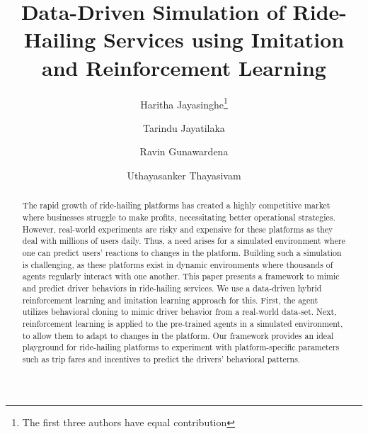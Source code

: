 \documentclass[runningheads]{llncs}
\begin{document}
%
\title{Data-Driven Simulation of Ride-Hailing Services using Imitation and Reinforcement Learning}
%
%
\newcommand*\samethanks[1][\value{footnote}]{\footnotemark[#1]}
\author{Haritha Jayasinghe\thanks{The first three authors have equal contribution} \and
Tarindu Jayatilaka\samethanks \and
Ravin Gunawardena\samethanks \and
Uthayasanker Thayasivam}
%
%
%
\maketitle              %

\begin{abstract}
The rapid growth of ride-hailing platforms has created a highly competitive market where businesses struggle to make profits, necessitating better operational strategies. However, real-world experiments are risky and expensive for these platforms as they deal with millions of users daily. Thus, a need arises for a simulated environment where one can predict users' reactions to changes in the platform. Building such a simulation is challenging, as these platforms exist in dynamic environments where thousands of agents regularly interact with one another. This paper presents a framework to mimic and predict driver behaviors in ride-hailing services. We use a data-driven hybrid reinforcement learning and imitation learning approach for this. First, the agent utilizes behavioral cloning to mimic driver behavior from a real-world data-set. Next, reinforcement learning is applied to the pre-trained agents in a simulated environment, to allow them to adapt to changes in the platform. Our framework provides an ideal playground for ride-hailing platforms to experiment with platform-specific parameters such as trip fares and incentives to predict the drivers’ behavioral patterns. 

\end{abstract}
%
%
%
\end{document}
